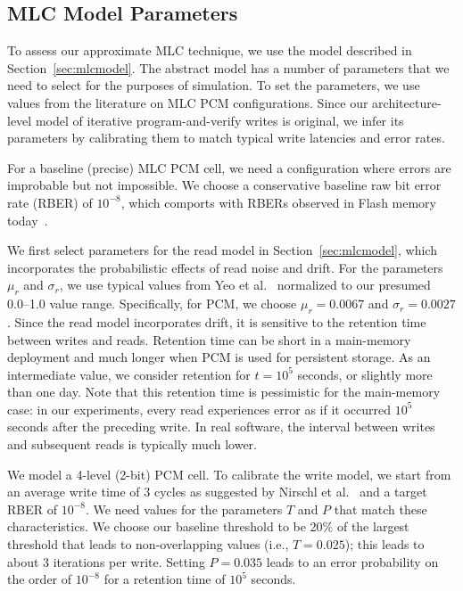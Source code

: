 \documentclass[prodmode,acmtocs]{acmsmall}
\begin{document}
\subsection{MLC Model Parameters}
\label{sec:errorparams}

To assess our approximate MLC technique, we use the model described in
Section~\ref{sec:mlcmodel}. The abstract model has a number of parameters that
we need to select for the purposes of simulation. To set the parameters, we use
values from the literature on MLC PCM configurations. Since our
architecture-level model of iterative program-and-verify writes is original, we
infer its parameters by calibrating them to match typical write latencies and error
rates.

For a baseline (precise) MLC PCM cell, we need a configuration where
errors are improbable but not impossible. We choose a conservative
baseline raw bit error rate (RBER) of $10^{-8}$, which comports with
RBERs observed in Flash memory today~\cite{flasherror,flasherrors}.

We first select parameters for the read model in Section~\ref{sec:mlcmodel},
which incorporates the probabilistic effects of read noise and drift.
For the parameters $\mu_r$ and $\sigma_r$, we use typical values from
Yeo et al.~\cite{wdddmlcpcm} normalized to our presumed 0.0--1.0 value
range. Specifically, for PCM, we choose $\mu_r = 0.0067$ and $\sigma_r
= 0.0027$. Since the read model incorporates drift, it is sensitive to
the retention time between writes and reads. Retention time can be
short in a main-memory deployment and much longer when PCM is
used for persistent storage.  As an intermediate value, we consider
retention for $t = 10^{5}$ seconds, or slightly more than one day.
Note that this retention time is pessimistic for the main-memory
case: in our experiments, every read experiences error as if it
occurred $10^5$ seconds after the preceding write. In real software,
the interval between writes and subsequent reads is typically much
lower.

We model a 4-level (2-bit) PCM cell. To calibrate the write model, we start from an average write
time of 3 cycles as suggested by Nirschl et
al.~\cite{mlcwritestrategies} and a target RBER of $10^{-8}$.
We need values for the parameters $T$ and $P$ that
match these characteristics. We choose our baseline threshold to be 20\%
of the largest threshold that leads to non-overlapping values
(i.e., $T = 0.025$); this leads to about 3 iterations per write.
Setting $P = 0.035$ leads to an error probability on the order of
$10^{-8}$ for a retention time of $10^5$ seconds.
\end{document}
